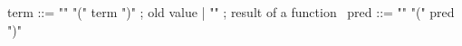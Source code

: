 \begin{syntax}
  term ::= "\old" "(" term ")" ; old value
       | "\result" ; result of a function
       \
  pred ::= "\old" "(" pred ")" 
\end{syntax}

